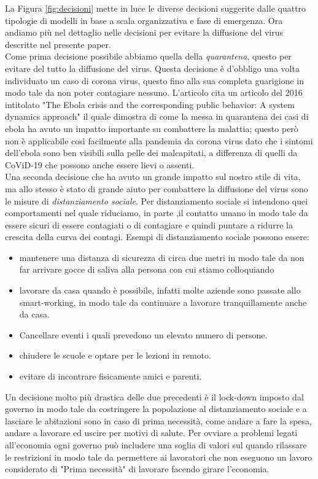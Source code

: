 \documentclass[12pt, openany]{book}
\begin{document}
 	La Figura \ref{fig:decisioni} mette in luce le diverse decisioni suggerite dalle quattro tipologie di modelli in base a scala organizzativa e fase di emergenza.
	Ora andiamo più nel dettaglio nelle decisioni per evitare la diffusione del virus descritte nel presente paper.\\
	Come prima decisione possibile abbiamo quella della \emph{quarantena}, questo per evitare del tutto la diffusione del virus. Questa decisione è d'obbligo una volta individuato un caso di corona virus, questo fino alla sua completa guarigione in modo tale da non poter contagiare nessuno. L'articolo cita un articolo del 2016 intitolato "The Ebola crisis and the corresponding public behavior: A system dynamics approach" il quale dimostra di come la messa in quarantena dei casi di ebola ha avuto un impatto importante su combattere la malattia; questo però non è applicabile così facilmente alla pandemia da corona virus dato che i sintomi dell'ebola sono ben visibili sulla pelle dei malcapitati, a differenza di quelli da CoViD-19 che possono anche essere lievi o assenti.\\
	Una seconda decisione che ha avuto un grande impatto sul nostro stile di vita, ma allo stesso è stato di grande aiuto per combattere la diffusione del virus sono le misure di \emph{distanziamento sociale}. Per distanziamento sociale si intendono quei comportamenti nel quale riduciamo, in parte ,il contatto umano in modo tale da essere sicuri di essere contagiati o di contagiare e quindi puntare a ridurre la crescita della curva dei contagi. Esempi di distanziamento sociale possono essere: \begin{itemize}
		\item mantenere una distanza di sicurezza di circa due metri in modo tale da non far arrivare gocce di saliva alla persona con cui stiamo colloquiando
		\item lavorare da casa quando è possibile, infatti molte aziende sono passate allo smart-working, in modo tale da continuare a lavorare tranquillamente anche da casa.
		\item Cancellare eventi i quali prevedono un elevato numero di persone.
		\item chiudere le scuole e optare per le lezioni in remoto.
		\item evitare di incontrare fisicamente amici e parenti.
	\end{itemize}
	Un decisione molto più drastica delle due precedenti è il lock-down imposto dal governo in modo tale da costringere la popolazione al distanziamento sociale e a lasciare le abitazioni sono in caso di prima necessità, come andare a fare la spesa, andare a lavorare ed uscire per motivi di salute. Per ovviare a problemi legati all'economia ogni governo può includere una soglia di valori sul quando rilassare le restrizioni in modo tale da permettere ai lavoratori che non eseguono un lavoro considerato di "Prima necessità" di lavorare facendo girare l'economia.\\
\end{document}
